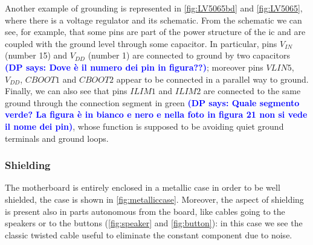 \documentclass[11pt,a4paper,titlepage]{article}
\newcommand{\DP}[1]{\textcolor{blue}{\textbf{(DP says: #1)}}}
\begin{document}
		  Another example of grounding is represented in \autoref{fig:LV5065bd} and \autoref{fig:LV5065}, where there is a voltage regulator and its schematic. From the schematic we can see, for example, that some pins are part of the power structure of the \gls{ic} and are coupled with the ground level through some capacitor. In particular, pins $V_{IN}$ (number 15) and $V_{DD}$ (number 1) are connected to ground by two capacitors \DP{Dove è il numero dei pin in figura??}; moreover pins $VLIN5$, $V_{DD}$, $CBOOT1$ and $CBOOT2$ appear to be connected in a parallel way to ground. Finally, we can also see that pins $ILIM1$ and $ILIM2$ are connected to the same ground through the connection segment in green \DP{Quale segmento verde? La figura è in bianco e nero e nella foto in figura 21 non si vede il nome dei pin}, whose function is supposed to be avoiding quiet ground terminals and ground loops.

		  \subsubsection{Shielding}
				The motherboard is entirely enclosed in a metallic case in order to be well shielded, the case is shown in \autoref{fig:metalliccase}. Moreover, the aspect of shielding is present also in parts autonomous from the board, like cables going to the speakers or to the buttons (\autoref{fig:speaker} and \autoref{fig:button}): in this case we see the classic twisted cable useful to eliminate the constant component due to noise.
\end{document}

